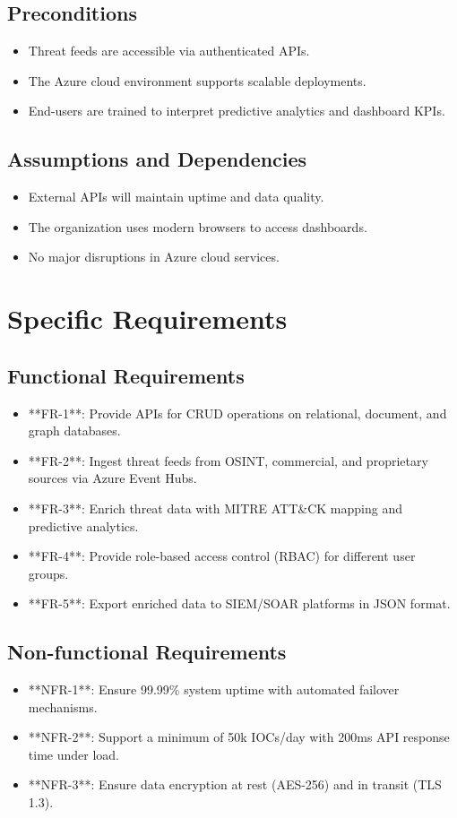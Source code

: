 \documentclass[12pt]{article}
\begin{document}
\subsection{Preconditions}
\begin{itemize}
    \item Threat feeds are accessible via authenticated APIs.
    \item The Azure cloud environment supports scalable deployments.
    \item End-users are trained to interpret predictive analytics and dashboard KPIs.
\end{itemize}

\subsection{Assumptions and Dependencies}
\begin{itemize}
    \item External APIs will maintain uptime and data quality.
    \item The organization uses modern browsers to access dashboards.
    \item No major disruptions in Azure cloud services.
\end{itemize}

\newpage

\section{Specific Requirements}
\subsection{Functional Requirements}
\begin{itemize}
    \item **FR-1**: Provide APIs for CRUD operations on relational, document, and graph databases.
    \item **FR-2**: Ingest threat feeds from OSINT, commercial, and proprietary sources via Azure Event Hubs.
    \item **FR-3**: Enrich threat data with MITRE ATT&CK mapping and predictive analytics.
    \item **FR-4**: Provide role-based access control (RBAC) for different user groups.
    \item **FR-5**: Export enriched data to SIEM/SOAR platforms in JSON format.
\end{itemize}

\subsection{Non-functional Requirements}
\begin{itemize}
    \item **NFR-1**: Ensure 99.99\% system uptime with automated failover mechanisms.
    \item **NFR-2**: Support a minimum of 50k IOCs/day with 200ms API response time under load.
    \item **NFR-3**: Ensure data encryption at rest (AES-256) and in transit (TLS 1.3).
\end{itemize}
\end{document}
